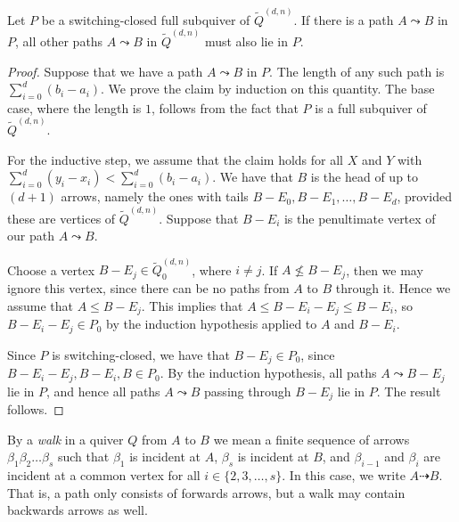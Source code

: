 \documentclass[ALCO,Unicode,published]{cedram}
\newcommand{\walk}{\dashrightarrow}
\newcommand{\tqdn}{\tilde{Q}^{(d, n)}}
\begin{document}
\begin{lemma}\label{lem:all_paths}
Let $P$ be a switching-closed full subquiver of $\tqdn$. If there is a path $A \leadsto B$ in $P$, all other paths $A \leadsto B$ in $\tqdn$ must also lie in $P$.
\end{lemma}
\begin{proof}
Suppose that we have a path $A \leadsto B$ in $P$. The length of any such path is $\sum_{i = 0}^{d}(b_{i} - a_{i})$. We prove the claim by induction on this quantity. The base case, where the length is $1$, follows from the fact that $P$ is a full subquiver of $\tqdn$.

For the inductive step, we assume that the claim holds for all $X$ and $Y$ with $\sum_{i = 0}^{d}(y_{i} - x_{i}) < \sum_{i = 0}^{d}(b_{i} - a_{i})$. We have that $B$ is the head of up to $(d + 1)$ arrows, namely the ones with tails $B - E_{0}, B - E_{1}, \dots, B - E_{d}$, provided these are vertices of $\tqdn$. Suppose that $B - E_{i}$ is the penultimate vertex of our path $A \leadsto B$.

Choose a vertex $B - E_{j} \in \tqdn_{0}$, where $i \neq j$. If $A \not\leqslant B - E_{j}$, then we may ignore this vertex, since there can be no paths from $A$ to $B$ through it. Hence we assume that $A \leqslant B - E_{j}$. This implies that $A \leqslant B - E_{i} - E_{j} \leqslant B - E_{i}$, so $B - E_{i} - E_{j} \in P_{0}$ by the induction hypothesis applied to $A$ and $B - E_{i}$.

Since $P$ is switching-closed, we have that $B - E_{j} \in P_{0}$, since $B - E_{i} - E_{j}, B - E_{i}, B \in P_{0}$. By the induction hypothesis, all paths $A \leadsto B - E_{j}$ lie in $P$, and hence all paths $A \leadsto B$ passing through $B - E_{j}$ lie in $P$. The result follows.
\end{proof}

By a \emph{walk} in a quiver $Q$ from $A$ to $B$ we mean a finite sequence of arrows $\beta_{1}\beta_{2}\dots\beta_{s}$ such that $\beta_{1}$ is incident at $A$, $\beta_{s}$ is incident at $B$, and $\beta_{i-1}$ and $\beta_{i}$ are incident at a common vertex for all $i \in \{2, 3, \dots, s\}$. In this case, we write $A \walk B$. That is, a path only consists of forwards arrows, but a walk may contain backwards arrows as well.
\end{document}
